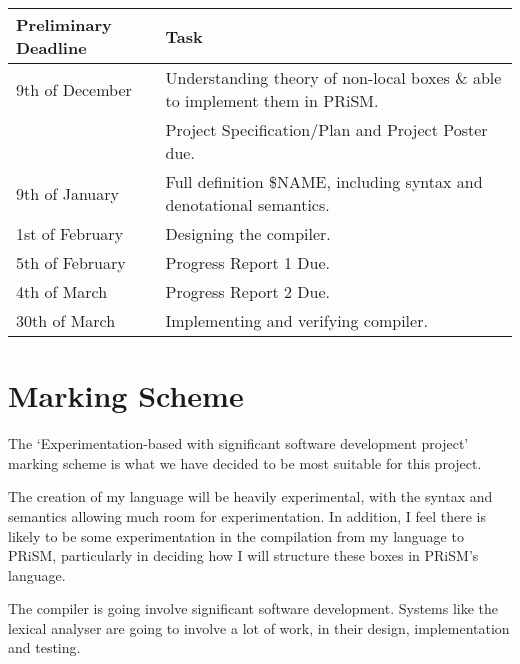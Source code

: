 \documentclass[11pt, a4paper]{article}
\begin{document}
\begin{center}
    \begin{tabular}{l | p{7.5cm}}
        Preliminary Deadline & Task \\
        \hline
        9th of December & Understanding theory of non-local boxes \& able to
        implement them in PRiSM. \\

        & Project Specification/Plan and Project Poster due. \\

        9th of January & Full definition \$NAME, including syntax and
        denotational semantics. \\

        1st of February & Designing the compiler. \\

        5th of February & Progress Report 1 Due. \\

        4th of March & Progress Report 2 Due. \\

        30th of March & Implementing and verifying compiler. \\
\end{tabular}
\end{center}

\section{Marking Scheme} %
\label{sec:marking_scheme}
The `Experimentation-based with significant software development project'
marking scheme is what we have decided to be most suitable for this project.

The creation of my language will be heavily experimental, with the syntax and
semantics allowing much room for experimentation. In addition, I feel there is
likely to be some experimentation in the compilation from my language to PRiSM,
particularly in deciding how I will structure these boxes in PRiSM's language.

The compiler is going involve significant software development. Systems like the
lexical analyser are going to involve a lot of work, in their design,
implementation and testing. 

\newpage


\end{document}
